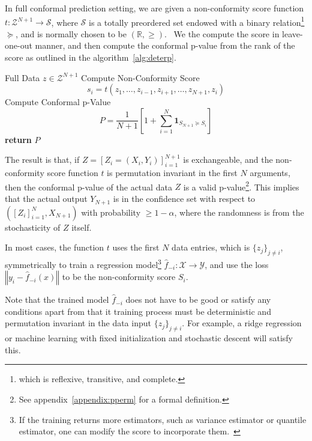 \documentclass{article}
\newcommand{\norm}[1]{\left\Vert #1 \right\Vert}
\newcommand{\oo}[1]{\left( #1 \right)}
\newcommand{\cc}[1]{\left[ #1 \right]}
\begin{document}
    In full conformal prediction setting, we are given a non-conformity score function $t: \mathcal{Z}^{N+1} \to \mathcal{S}$, where $\mathcal{S}$ is a totally preordered set endowed with a binary relation\footnote{which is reflexive, transitive, and complete.}$\succcurlyeq$, and is normally chosen to be $\oo{\mathbb{R}, \ge}$.~\citep{vovk2005algorithmic,vovk2016criteria} We the compute the score in leave-one-out manner, and then compute the conformal p-value from the rank of the score as outlined in the algorithm~\ref{alg:deterp}.

    \begin{algorithm}
    \caption{Conformal p-Value via Deterministic $t$}
    \label{alg:deterp}
    \begin{algorithmic}[1]
    \REQUIRE Full Data $z \in \mathcal{Z}^{N+1}$
        \STATE Compute Non-Conformity Score
        \[
        s_i = t\oo{z_1, \dots, z_{i-1}, z_{i+1}, \dots, z_{N+1}, z_i}\]
    \ENDFOR
    \STATE Compute Conformal p-Value
    \[P = \frac{1}{N+1} \cc{1 + \sum_{i=1}^{N} \mathbf{1}_{S_{N+1} \succcurlyeq S_i}}\]
    \STATE \textbf{return} $P$
    \end{algorithmic}
    \end{algorithm}

    The result is that, if $Z = \cc{Z_i = (X_i, Y_i)}_{i=1}^{N+1}$ is exchangeable, and the non-conformity score function $t$ is permutation invariant in the first $N$ arguments, then the conformal p-value of the actual data $Z$ is a valid p-value\footnote{See appendix~\ref{appendix:pperm} for a formal definition.}. This implies that the actual output $Y_{N+1}$ is in the confidence set with respect to $\oo{\cc{Z_i}_{i=1}^N, X_{N+1}}$ with probability $\ge 1-\alpha$, where the randomness is from the stochasticity of $Z$ itself.

    In most cases, the function $t$ uses the first $N$ data entries, which is $\{z_j\}_{j \ne i}$,  symmetrically to train a regression model\footnote{If the training returns more estimators, such as variance estimator or quantile estimator, one can modify the score to incorporate them.~\cite{papadopoulos2002inductive, romano2019conformalized}} $\hat{f}_{-i}: \mathcal{X} \to \mathcal{Y}$, and use the loss $\norm{y_i - \hat{f}_{-i}(x)}$ to be the non-conformity score $S_i$.

    Note that the trained model $\hat{f}_{-i}$ does not have to be good or satisfy any conditions apart from that it training process must be deterministic and permutation invariant in the data input $\{z_j\}_{j \ne i}$. For example, a ridge regression or machine learning with fixed initialization and stochastic descent will satisfy this. 
    
\end{document}
